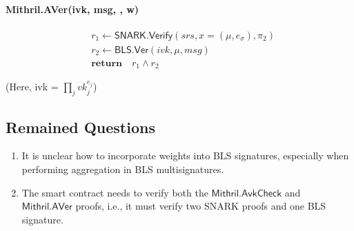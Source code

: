 \documentclass{article}
\begin{document}
\paragraph{Mithril.AVer(ivk, msg, \sigma*, w)}
\begin{align*}
&r_1 \leftarrow \mathsf{SNARK.Verify}(srs, x = (\mu, e_{\sigma}),\pi_2)\\
&r_2 \leftarrow \mathsf{BLS.Ver}(ivk,\mu,msg) \\
&\textbf{return}\quad r_1 \land r_2
\end{align*}

(Here, ivk = $\prod_j vk_j^{e_j}$)


\subsection{Remained Questions}
\begin{enumerate}
    \item It is unclear how to incorporate weights into BLS signatures, especially when performing aggregation in BLS multisignatures.
    \item The smart contract needs to verify both the $\mathsf{Mithril.AvkCheck}$ and $\mathsf{Mithril.AVer}$ proofs, i.e., it must verify two SNARK proofs and one BLS signature.
\end{enumerate}









\end{document}
